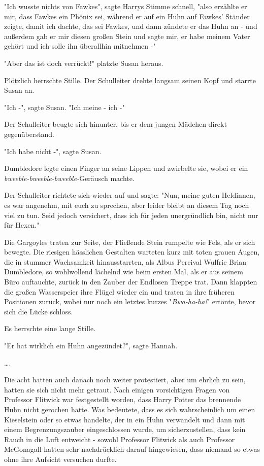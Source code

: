 {"Ich wusste nichts von Fawkes", sagte Harrys Stimme schnell, "also erzählte er mir, dass Fawkes ein Phönix sei, während er auf ein Huhn auf Fawkes' Ständer zeigte, damit ich dachte, das sei Fawkes, und dann zündete er das Huhn an - und außerdem gab er mir diesen großen Stein und sagte mir, er habe meinem Vater gehört und ich solle ihn überallhin mitnehmen -"

"Aber das ist doch verrückt!" platzte Susan heraus.

Plötzlich herrschte Stille. Der Schulleiter drehte langsam seinen Kopf und starrte Susan an.

"Ich -", sagte Susan. "Ich meine - ich -"

Der Schulleiter beugte sich hinunter, bis er dem jungen Mädchen direkt gegenüberstand.

"Ich habe nicht -", sagte Susan.

Dumbledore legte einen Finger an seine Lippen und zwirbelte sie, wobei er ein \emph{bweeble-bweeble-bweeble-}Geräusch machte.

Der Schulleiter richtete sich wieder auf und sagte: "Nun, meine guten Heldinnen, es war angenehm, mit euch zu sprechen, aber leider bleibt an diesem Tag noch viel zu tun. Seid jedoch versichert, dass ich für jeden unergründlich bin, nicht nur für Hexen."

Die Gargoyles traten zur Seite, der Fließende Stein rumpelte wie Fels, als er sich bewegte. Die riesigen hässlichen Gestalten warteten kurz mit toten grauen Augen, die in stummer Wachsamkeit hinausstarrten, als Albus Percival Wulfric Brian Dumbledore, so wohlwollend lächelnd wie beim ersten Mal, als er aus seinem Büro auftauchte, zurück in den Zauber der Endlosen Treppe trat. Dann klappten die großen Wasserspeier ihre Flügel wieder ein und traten in ihre früheren Positionen zurück, wobei nur noch ein letztes kurzes "\emph{Bwa-ha-ha!}" ertönte, bevor sich die Lücke schloss.

Es herrschte eine lange Stille.

"Er hat wirklich ein Huhn angezündet?", sagte Hannah.

….

Die acht hatten auch danach noch weiter protestiert, aber um ehrlich zu sein, hatten sie sich nicht mehr getraut. Nach einigen vorsichtigen Fragen von Professor Flitwick war festgestellt worden, dass Harry Potter das brennende Huhn nicht gerochen hatte. Was bedeutete, dass es sich wahrscheinlich um einen Kieselstein oder so etwas handelte, der in ein Huhn verwandelt und dann mit einem Begrenzungszauber eingeschlossen wurde, um sicherzustellen, dass kein Rauch in die Luft entweicht - sowohl Professor Flitwick als auch Professor McGonagall hatten sehr nachdrücklich darauf hingewiesen, dass niemand so etwas ohne ihre Aufsicht versuchen durfte.

}
